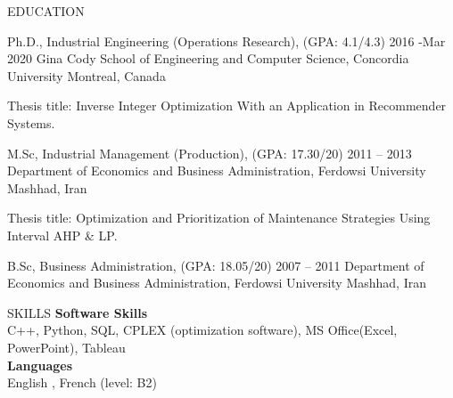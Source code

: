\documentclass{resume} %
\begin{document}
\begin{rSection}{EDUCATION}
\begin{rSubsection}{Ph.D., Industrial Engineering (Operations Research), (GPA: 4.1/4.3)} {2016 -Mar 2020}{
 Gina Cody School of Engineering and Computer Science, Concordia University}{ Montreal, Canada}
\item  Thesis title: Inverse Integer Optimization With an Application in Recommender Systems.
\end{rSubsection}
\begin{rSubsection}{M.Sc, Industrial Management (Production), (GPA: 17.30/20)} { 2011 -- 2013} {Department of Economics and Business Administration,
    Ferdowsi University}{ Mashhad, Iran}
\item Thesis title: Optimization and Prioritization of Maintenance Strategies Using Interval AHP \& LP. 
\end{rSubsection}
\begin{rSubsection}{ B.Sc, Business Administration,  (GPA: 18.05/20)} { 2007 -- 2011}
 {Department of Economics and Business Administration, Ferdowsi University}{ Mashhad, Iran}

\end{rSubsection}
\end{rSection} 
 

\begin{rSection}{SKILLS}
{\bf  Software Skills}  \\ 
C++, Python, SQL, CPLEX (optimization software), MS Office(Excel, PowerPoint), Tableau\\
 {\bf  Languages}  \\ 
{English , French (level: B2)} 
\end{rSection}
\end{document}
